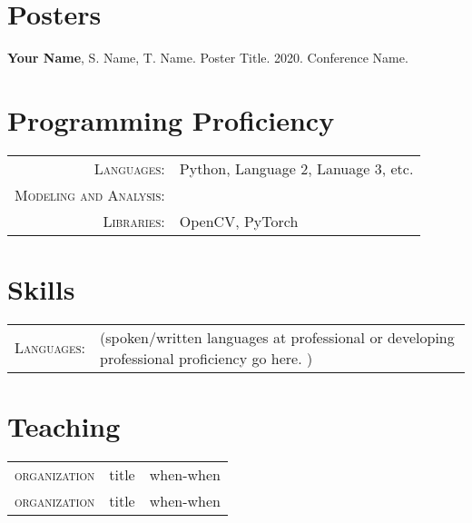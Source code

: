 \documentclass[a4paper,11pt]{article}
\begin{document}
\section{Posters}
\begin{enumerate}[noitemsep, leftmargin=*,label={[P\arabic*]}]
\item{\textbf{Your Name}, S. Name, T. Name. Poster Title. 2020. Conference Name.}
\end{enumerate}

\section{Programming Proficiency}
\begin{tabular}{rl}
  \textsc{Languages:}& Python, Language 2, Lanuage 3, etc.\\
  \textsc{Modeling and Analysis:}& \\
  \textsc{Libraries:}& OpenCV, PyTorch \\
\end{tabular}

\section{Skills}
\begin{tabular}{rl}
  \textsc{Languages:}& (spoken/written languages at professional or developing professional proficiency go here. )\\
\end{tabular}




\section{Teaching}
\begin{tabular}{llr}
	 \textsc{organization}& title & when-when\\
	 \textsc{organization}& title & when-when\\
\end{tabular}
\end{document}
